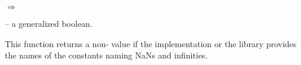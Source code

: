 \documentclass[../Environment-Queries.tex]{subfiles}
\begin{document}

\DSyntax{}

 
$\Rightarrow$ 

\DArgsNValues{}

 -- a generalized boolean.

\DDescription{}

This function returns a non- value if the \CL{}
implementation or the \CL{} library provides the names of the
constants naming NaNs and infinities.
\end{document}
